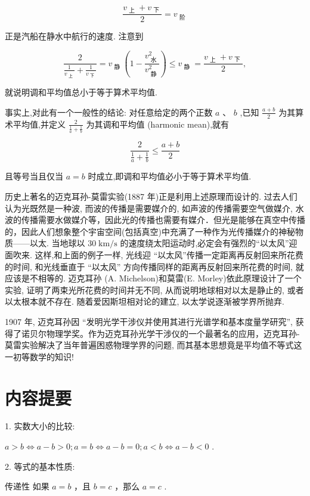 \documentclass[a4paper,10pt,oneside,fontset=none]{ctexbook}
\renewcommand{\leq}{\leqslant}
\numberwithin{equation}{chapter}
\begin{document}
$$
\frac{{v}_{\text{ 上 }} + {v}_{\text{ 下 }}}{2} = {v}_{\text{ 阶 }}
$$

正是汽船在静水中航行的速度. 注意到

$$
\frac{2}{\frac{1}{{v}_{\mathrm{\text{ 上 }}}} + \frac{1}{{v}_{\mathrm{\text{ 下 }}}}} = {v}_{\text{ 静 }}\left( {1 - \frac{{v}_{\text{ 水 }}^{2}}{{v}_{\text{ 静 }}^{2}}}\right)  \leq  {v}_{\text{ 静 }} = \frac{{v}_{\mathrm{\text{ 上 }}} + {v}_{\mathrm{\text{ 下 }}}}{2},
$$

就说明调和平均值总小于等于算术平均值.

事实上,对此有一个一般性的结论: 对任意给定的两个正数 $a\text{ 、 }b$ ,已知 $\frac{a + b}{2}$ 为其算术平均值,并定义 $\frac{2}{\frac{1}{a} + \frac{1}{b}}$ 为其调和平均值 (harmonic mean),就有

$$
\frac{2}{\frac{1}{a} + \frac{1}{b}} \leq  \frac{a + b}{2}
$$

且等号当且仅当 $a = b$ 时成立,即调和平均值必小于等于算术平均值.

历史上著名的迈克耳孙-莫雷实验(1887 年)正是利用上述原理而设计的. 过去人们认为光既然是一种波, 而波的传播是需要媒介的, 如声波的传播需要空气做媒介, 水波的传播需要水做媒介等，因此光的传播也需要有媒介．但光是能够在真空中传播的，因此人们想象整个宇宙空间(包括真空)中充满了一种作为光传播媒介的神秘物质——以太. 当地球以 ${30}\mathrm{\;{km}}/\mathrm{s}$ 的速度绕太阳运动时,必定会有强烈的“以太风”迎面吹来. 这样,和上面的例子一样, 光线迎 “以太风”传播一定距离再反射回来所花费的时间, 和光线垂直于 “以太风” 方向传播同样的距离再反射回来所花费的时间, 就应该是不相等的. 迈克耳孙 (A. Michelson)和莫雷(E. Morley)依此原理设计了一个实验, 证明了两束光所花费的时间并无不同, 从而说明地球相对以太是静止的, 或者以太根本就不存在. 随着爱因斯坦相对论的建立, 以太学说逐渐被学界所抛弃.

1907 年, 迈克耳孙因 “发明光学干涉仪并使用其进行光谱学和基本度量学研究”, 获得了诺贝尔物理学奖。作为迈克耳孙光学干涉仪的一个最著名的应用，迈克耳孙-莫雷实验解决了当年普遍困惑物理学界的问题, 而其基本思想竟是平均值不等式这一初等数学的知识!

\section*{内容提要}

1. 实数大小的比较:

$a > b \Leftrightarrow  a - b > 0;a = b \Leftrightarrow  a - b = 0;a < b \Leftrightarrow  a - b < 0$ .

2. 等式的基本性质:

传递性 如果 $a = b$ ，且 $b = c$ ，那么 $a = c$ .
\end{document}
